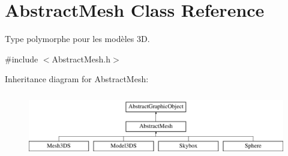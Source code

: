 \hypertarget{classAbstractMesh}{\section{Abstract\-Mesh Class Reference}
\label{classAbstractMesh}
}


Type polymorphe pour les modèles 3\-D.  




{\ttfamily \#include $<$Abstract\-Mesh.\-h$>$}

Inheritance diagram for Abstract\-Mesh\-:\begin{figure}[H]
\begin{center}
\leavevmode
\includegraphics[height=2.818792cm]{classAbstractMesh}
\end{center}
\end{figure}
